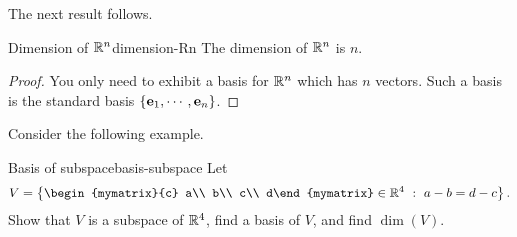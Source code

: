The next result follows.

\begin{corollary}{Dimension of $\mathbb{R}^n$}{dimension-Rn}
The dimension of $\mathbb{R}^{n}$ is $n$. 
\end{corollary}

\begin{proof}
You only need to exhibit a basis for $\mathbb{R}^{n}$ which
has $n$ vectors. Such a basis is the standard basis $\left\{\mbox{\bf e}_{1},\cdots , \mbox{\bf e}_{n}\right\}$.
\end{proof}

Consider the following example.

\begin{example}{Basis of subspace}{basis-subspace}
Let 
\[ V=\set{
\begin{mymatrix}{c} a\\ b\\ c\\ d\end{mymatrix}\in\R^4
~:~ a-b=d-c }.\]
Show that $V$ is a subspace of $\mathbb{R}^4$,
find a basis of $V$, and find $\dim(V)$.
\end{example}

